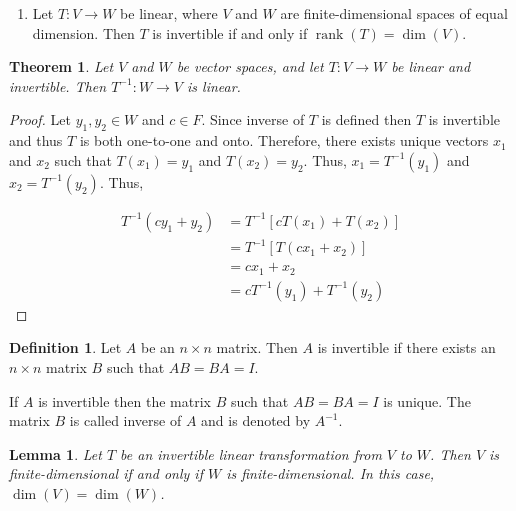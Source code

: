 \documentclass[12pt, a4paper]{article}
\newtheorem{theorem}{Theorem}[section]
\newtheorem{lemma}{Lemma}[section]
\theoremstyle{definition}
\newtheorem{definition}{Definition}[section]
\theoremstyle{remark}
\DeclareMathOperator{\rank}{rank}
\begin{document}
\begin{enumerate}
    \item[(3)] Let $T: V \to W$ be linear, where $V$ and $W$ are finite-dimensional spaces of equal dimension. Then $T$ is invertible if and only if $\rank(T) = \dim(V)$.
\end{enumerate}

\begin{theorem}
    Let $V$ and $W$ be vector spaces, and let $T: V \to W$ be linear and invertible. Then $T^{-1}: W \to V$ is linear.
\end{theorem}

\begin{proof}
    Let $y_1, y_2 \in W$ and $c \in F$. Since inverse of $T$ is defined then $T$ is invertible and thus $T$ is both one-to-one and onto. Therefore, there exists unique vectors $x_1$ and $x_2$ such that $T(x_1) = y_1$ and $T(x_2) = y_2$. Thus, $x_1 = T^{-1}(y_1)$ and $x_2 = T^{-1}(y_2)$. Thus,

    \begin{align*}
        T^{-1}(cy_1 + y_2) &= T^{-1}[cT(x_1) + T(x_2)] \\
        &= T^{-1}[T(cx_1 + x_2)] \\
        &= cx_1 + x_2 \\
        &= cT^{-1}(y_1) + T^{-1}(y_2)
    \end{align*}
\end{proof}

\begin{definition}
    Let $A$ be an $n \times n$ matrix. Then $A$ is invertible if there exists an $n \times n$ matrix $B$ such that $AB = BA = I$.
\end{definition}

 If $A$ is invertible then the matrix $B$ such that $AB = BA = I$ is unique. The matrix $B$ is called inverse of $A$ and is denoted by $A^{-1}$.

 \begin{lemma}
     Let $T$ be an invertible linear transformation from $V$ to $W$. Then $V$ is finite-dimensional if and only if $W$ is finite-dimensional. In this case, $\dim(V) = \dim(W)$.
 \end{lemma}
\end{document}
